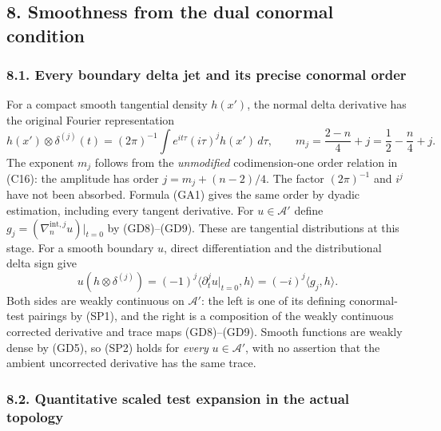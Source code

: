 \documentclass[
  11pt,
]{article}
\makeatletter
\let\ReaderOriginalAnchorStart\hyper@anchorstart
\let\ReaderOriginalAnchorEnd\hyper@anchorend
\let\ReaderPendingAliases\@empty
\def\ReaderArmAliases#1{\gdef\ReaderPendingAliases{#1}}
\def\hyper@anchorstart#1{\ReaderIfNativeAnchorTF{#1}{\ReaderPendingAliases\global\let\ReaderPendingAliases\@empty}{}\ReaderOriginalAnchorStart{#1}}
\makeatother
\begin{document}
\ReaderArmAliases{\ReaderOriginalAnchorStart{AN03-GBD-008}\ReaderOriginalAnchorEnd\begingroup\expandafter\def\csname @currentHref\endcsname{AN03-GBD-008}\label{AN03-GBD-008}\endgroup\ReaderOriginalAnchorStart{8-smoothness-from-the-dual-conormal-condition}\ReaderOriginalAnchorEnd\begingroup\expandafter\def\csname @currentHref\endcsname{8-smoothness-from-the-dual-conormal-condition}\label{8-smoothness-from-the-dual-conormal-condition}\endgroup}
\subsection{8. Smoothness from the dual conormal
condition}\label{smoothness-from-the-dual-conormal-condition}

\subsubsection{8.1. Every boundary delta jet and its precise conormal
order}\label{every-boundary-delta-jet-and-its-precise-conormal-order}

For a compact smooth tangential density \(h(x')\), the normal delta
derivative has the original Fourier representation \[
 h(x')\otimes\delta^{(j)}(t)
  =(2\pi)^{-1}\int e^{it\tau}(i\tau)^j h(x')\,d\tau,
 \qquad
 m_j=\frac{2-n}{4}+j=\frac12-\frac n4+j.
 \tag{SP1}
\] The exponent \(m_j\) follows from the \emph{unmodified}
codimension-one order relation in (C16): the amplitude has order
\(j=m_j+(n-2)/4\). The factor \((2\pi)^{-1}\) and \(i^j\) have not been
absorbed. Formula (GA1) gives the same order by dyadic estimation,
including every tangent derivative. For \(u\in\mathcal A'\) define
\(g_j=(\nabla_n^{\mathrm{int},j}u)|_{t=0}\) by (GD8)--(GD9). These are
tangential distributions at this stage. For a smooth boundary \(u\),
direct differentiation and the distributional delta sign give \[
 u(h\otimes\delta^{(j)})=(-1)^j
       \langle\partial_t^ju|_{t=0},h\rangle
       =(-i)^j\langle g_j,h\rangle.
 \tag{SP2}
\] Both sides are weakly continuous on \(\mathcal A'\): the left is one
of its defining conormal-test pairings by (SP1), and the right is a
composition of the weakly continuous corrected derivative and trace maps
(GD8)--(GD9). Smooth functions are weakly dense by (GD5), so (SP2) holds
for \emph{every} \(u\in\mathcal A'\), with no assertion that the ambient
uncorrected derivative has the same trace.

\subsubsection{8.2. Quantitative scaled test expansion in the actual
topology}\label{quantitative-scaled-test-expansion-in-the-actual-topology}
\end{document}
